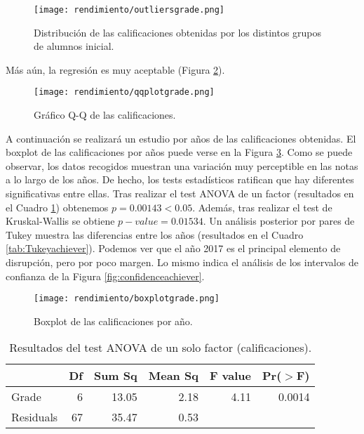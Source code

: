 \begin{figure}[H]
    \centering
    \texttt{[image: rendimiento/outliersgrade.png]}
    \caption{Distribución de las calificaciones obtenidas por los distintos grupos de alumnos inicial.}
    \label{fig:outliersgrade}
\end{figure}

Más aún, la regresión es muy aceptable (Figura \ref{fig:q-qsessionsachiever}).

\begin{figure}[H]
    \centering
    \texttt{[image: rendimiento/qqplotgrade.png]}
    \caption{Gráfico Q-Q de las calificaciones.}
    \label{fig:q-qsessionsachiever}
\end{figure}

A continuación se realizará un estudio por años de las calificaciones obtenidas. El boxplot de las calificaciones por años puede verse en la Figura \ref{fig:boxplotachieveryear}. Como se puede observar, los datos recogidos muestran una variación muy perceptible en las notas a lo largo de los años. De hecho, los tests estadísticos ratifican que hay diferentes significativas entre ellas. Tras realizar el test ANOVA de un factor (resultados en el Cuadro \ref{tab:ANOVAachiever}) obtenemos $p = 0.00143 < 0.05$. Además, tras realizar el test de Kruskal-Wallis se obtiene $p-value = 0.01534$. Un análisis posterior por pares de Tukey muestra las diferencias entre los años (resultados en el Cuadro \ref{tab:Tukeyachiever}). Podemos ver que el año 2017 es el principal elemento de disrupción, pero por poco margen. Lo mismo indica el análisis de los intervalos de confianza de la Figura \ref{fig:confidenceachiever}.

\begin{figure}[H]
    \centering
    \texttt{[image: rendimiento/boxplotgrade.png]}
    \caption{Boxplot de las calificaciones por año.}
    \label{fig:boxplotachieveryear}
\end{figure}

\begin{table}[H]
\centering
\caption{Resultados del test ANOVA de un solo factor (calificaciones).}
\label{tab:ANOVAachiever}
\centering
\begin{tabular}{lrrrrr}
  \hline
 & Df & Sum Sq & Mean Sq & F value & Pr($>$F) \\ 
  \hline
Grade & 6 & 13.05 & 2.18 & 4.11 & 0.0014 \\ 
  Residuals            & 67 & 35.47 & 0.53 &  &  \\ 
   \hline
\end{tabular}
\end{table}

